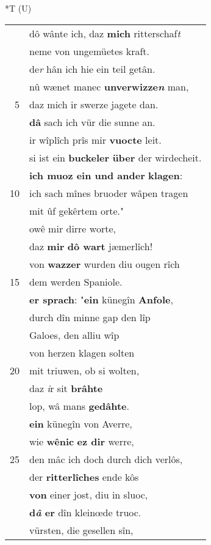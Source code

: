\documentclass[8pt,a4paper,notitlepage]{article}
\begin{document}
\begin{table}[ht]
\begin{minipage}[t]{0.5\linewidth}
\small
\begin{center}*T (U)
\end{center}
\begin{tabular}{rl}
 & dô wânte ich, daz \textbf{mich} ritterschaf\textit{t}\\ 
 & neme von ungemüetes kraft.\\ 
 & de\textit{r} hân ich hie ein teil getân.\\ 
 & nû wænet manec \textbf{unverwizze\textit{n}} man,\\ 
5 & daz mich ir swerze jagete dan.\\ 
 & \textbf{dâ} sach ich vür die sunne an.\\ 
 & ir wîplîch prîs mir \textbf{vuocte} leit.\\ 
 & si ist ein \textbf{buckeler} \textbf{über} der wirdecheit.\\ 
 & \textbf{ich muoz ein und ander} \textbf{klagen}:\\ 
10 & ich sach mînes bruoder wâpen tragen\\ 
 & mit ûf gekêrtem orte."\\ 
 & owê mir dirre worte,\\ 
 & daz \textbf{mir} \textbf{dô wart} jæmerlîch!\\ 
 & von \textbf{wazzer} wurden diu ougen rîch\\ 
15 & dem werden Spaniole.\\ 
 & \textbf{er sprach}: "\textbf{ein} künegîn \textbf{Anfole},\\ 
 & durch dîn minne gap den lîp\\ 
 & Galoes, den alliu wîp\\ 
 & von herzen klagen solten\\ 
20 & mit triuwen, ob si wolten,\\ 
 & daz \textit{i}r sit \textbf{brâhte}\\ 
 & lop, wâ mans \textbf{gedâhte}.\\ 
 & \textbf{ein} künegîn von Averre,\\ 
 & wie \textbf{wênic} \textbf{ez dir} werre,\\ 
25 & den mâc ich doch durch dich verlôs,\\ 
 & der \textbf{ritterlîches} ende kôs\\ 
 & \textbf{von} einer jost, diu in sluoc,\\ 
 & \textbf{d\textit{â} er} dîn kleinœde truoc.\\ 
 & vürsten, die gesellen sîn,\\ 

\end{tabular}
\end{minipage}
\end{table}
\end{document}
